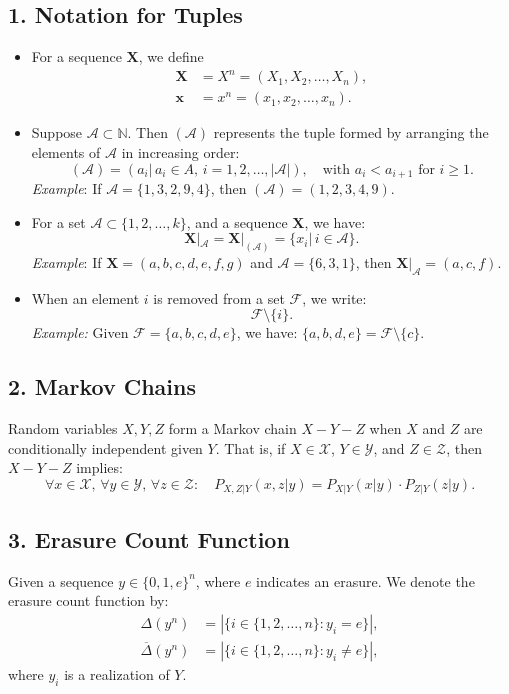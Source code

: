 \documentclass[runningheads]{llncs}
\begin{document}
\subsection*{1. Notation for Tuples}
\begin{itemize}
    \item For a sequence $\mathbf{X}$, we define
    \begin{align*}
        \mathbf{X} &= X^n = (X_1, X_2, \dots, X_n),\\
        \mathbf{x} &= x^n = (x_1, x_2, \dots, x_n).
    \end{align*}
    
    \item Suppose $\mathcal{A}\subset \mathbb{N}$. Then $(\mathcal{A})$ represents the tuple formed by arranging the elements of $\mathcal{A}$ in increasing order:
    \[
    (\mathcal{A}) = (a_i |\, a_i \in A, \, i = 1, 2, \dots, |\mathcal{A}|), \quad \text{with } a_i < a_{i+1} \text{ for } i \geq 1.
    \]
    \textit{Example}: If $\mathcal{A} = \{1, 3, 2, 9, 4\}$, then $(\mathcal{A}) = (1, 2, 3, 4, 9)$.
    
    \item For a set $\mathcal{A} \subset \{1, 2, \dots, k\}$, and a sequence $\mathbf{X}$, we have:
    \[
    \mathbf{X}|_{\mathcal{A}} = \mathbf{X}|_{(\mathcal{A})} = \big\{ x_i|\,i\in \mathcal{A}\big\}.
    \]
    \textit{Example}: If $\mathbf{X} = (a, b, c, d, e, f, g)$ and $\mathcal{A} = \{6, 3, 1\}$, then $\mathbf{X}|_{\mathcal{A}} = (a, c, f)$.
    \item When an element $i$ is removed from a set $\mathcal{F}$, we write: 
    \[
    \mathcal{F}\setminus\{i\}.
    \]
    \textit{Example:} Given $\mathcal{F}=\{a, b, c, d,e\}$, we have: $ \{a, b, d,e\}=\mathcal{F}\setminus\{c\}$.
\end{itemize}


\subsection*{2. Markov Chains}
Random variables $X, Y, Z$ form a Markov chain $X - Y - Z$ when $X$ and $Z$ are conditionally independent given $Y$. That is, if $X \in \mathcal{X}$, $Y \in \mathcal{Y}$, and $Z \in \mathcal{Z}$, then $X - Y - Z$ implies:
\[
\forall x \in \mathcal{X}, \, \forall y \in \mathcal{Y}, \, \forall z \in \mathcal{Z}: \quad P_{X,Z|Y}(x,z|y) = P_{X|Y}(x|y) \cdot P_{Z|Y}(z|y).
\]
\subsection*{3. Erasure Count Function}
Given a sequence $y \in \{0, 1, e\}^n$, where $e$ indicates an erasure. We denote the erasure count function by:
\begin{align*}
    \Delta(y^n) &= |\{i \in \{1, 2, \dots, n\} : y_i = e \}|, \\
    \overline{\Delta}(y^n) &= |\{i \in \{1, 2, \dots, n\} : y_i \neq e \}|,
\end{align*}
where $y_i$ is a realization of $Y$.
\end{document}
